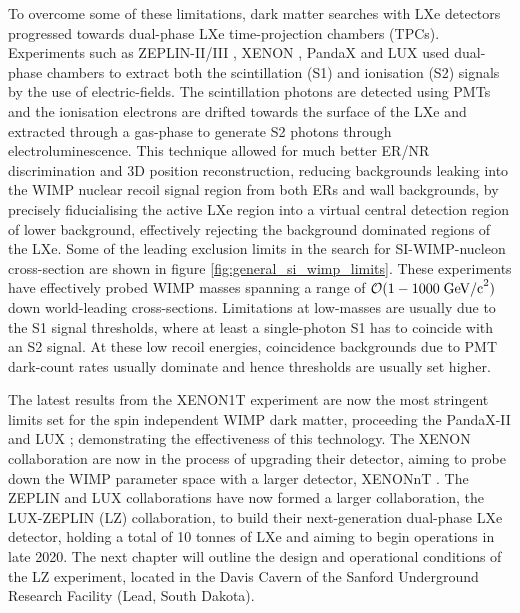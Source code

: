 {To overcome some of these limitations, dark matter searches with LXe detectors progressed towards dual-phase LXe time-projection chambers (TPCs). Experiments such as ZEPLIN-II/III \cite{zeplin2, zeplin3}, XENON \cite{xenon100}, PandaX \cite{pandax} and LUX \cite{LUX_experiment} used dual-phase chambers to extract both the scintillation (S1) and ionisation (S2) signals by the use of electric-fields. The scintillation photons are detected using PMTs and the ionisation electrons are drifted towards the surface of the LXe and extracted through a gas-phase to generate S2 photons through electroluminescence. This technique allowed for much better ER/NR discrimination and 3D position reconstruction, reducing backgrounds leaking into the WIMP nuclear recoil signal region from both ERs and wall backgrounds, by precisely fiducialising the active LXe region into a virtual central detection region of lower background, effectively rejecting the background dominated regions of the LXe. Some of the leading exclusion limits in the search for SI-WIMP-nucleon cross-section are shown in figure \ref{fig:general_si_wimp_limits}. These experiments have effectively probed WIMP masses spanning a range of $\mathcal{O}(1-1000 \; \text{GeV/c}^2)$ down world-leading cross-sections. Limitations at low-masses are usually due to the S1 signal thresholds, where at least a single-photon S1 has to coincide with an S2 signal. At these low recoil energies, coincidence backgrounds due to PMT dark-count rates usually dominate and hence thresholds are usually set higher. 

The latest results from the XENON1T \cite{xenon_1t} experiment are now the most stringent limits set for the spin independent WIMP dark matter, proceeding the PandaX-II \cite{pandax_limit} and LUX \cite{lux_extended}; demonstrating the effectiveness of this technology. The XENON collaboration are now in the process of upgrading their detector, aiming to probe down the WIMP parameter space with a larger detector, XENONnT \cite{Aprile:2020vtw}. The ZEPLIN and LUX collaborations have now formed a larger collaboration, the LUX-ZEPLIN (LZ) collaboration, to build their next-generation dual-phase LXe detector, holding a total of 10 tonnes of LXe and aiming to begin operations in late 2020. The next chapter will outline the design and operational conditions of the LZ experiment, located in the Davis Cavern of the Sanford Underground Research Facility (Lead, South Dakota).

}
